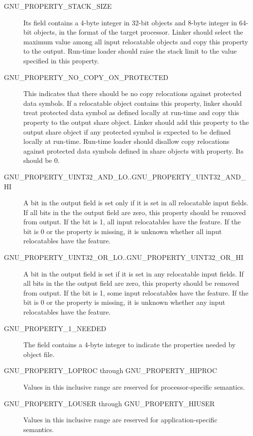 \begin{description}
 \item[GNU_PROPERTY_STACK_SIZE]
   Its  field contains a 4-byte integer in 32-bit objects
   and 8-byte integer in 64-bit objects, in the format of the target
   processor.  Linker should select the maximum value among all
   input relocatable objects and copy this property to the output.
   Run-time loader should raise the stack limit to the value specified
   in this property.
 \item[GNU_PROPERTY_NO_COPY_ON_PROTECTED]
   \begin{sloppypar}
   This indicates that there should be no copy relocations against
   protected data symbols.  If a relocatable object contains this
   property, linker should treat protected data symbol as defined
   locally at run-time and copy this property to the output share
   object.  Linker should add this property to the output share
   object if any protected symbol is expected to be defined locally
   at run-time.  Run-time loader should disallow copy relocations
   against protected data symbols defined in share objects with
    property.  Its
    should be 0.
   \end{sloppypar}
 \item[GNU_PROPERTY_UINT32_AND_LO..GNU_PROPERTY_UINT32_AND_HI]
   A bit in the output  field is set only if it is set in
   all relocatable input  fields.  If all bits in the
   the output  field are zero, this property should be
   removed from output.  If the bit is 1, all input relocatables have
   the feature.  If the bit is 0 or the property is missing, it is
   unknown whether all input relocatables have the feature.
 \item[GNU_PROPERTY_UINT32_OR_LO..GNU_PROPERTY_UINT32_OR_HI]
   A bit in the output  field is set if it is set in any
   relocatable input  fields.  If all bits in the
   the output  field are zero, this property should be
   removed from output.  If the bit is 1, some input relocatables have
   the feature.  If the bit is 0 or the property is missing, it is
   unknown whether any input relocatables have the feature.
 \item[GNU_PROPERTY_1_NEEDED]
   The  field contains a 4-byte integer to indicate the
   properties needed by object file.
 \item[GNU_PROPERTY_LOPROC through GNU_PROPERTY_HIPROC]
   Values in this inclusive range are reserved for processor-specific
   semantics.
 \item[GNU_PROPERTY_LOUSER through GNU_PROPERTY_HIUSER]
   Values in this inclusive range are reserved for application-specific
   semantics.
\end{description}


